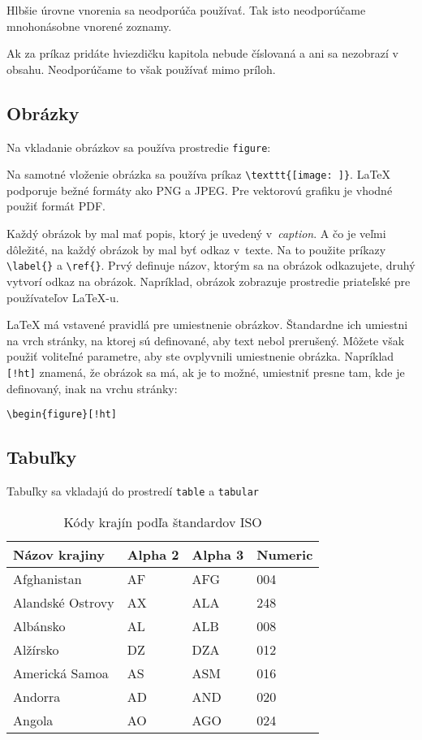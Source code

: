 Hlbšie úrovne vnorenia sa neodporúča používať. Tak isto neodporúčame mnohonásobne vnorené zoznamy.

Ak za príkaz pridáte hviezdičku kapitola nebude číslovaná a ani sa nezobrazí v obsahu. Neodporúčame to však používať mimo príloh.

\subsection*{Obrázky}

Na vkladanie obrázkov sa používa prostredie \texttt{figure}:

Na samotné vloženie obrázka sa používa príkaz \verb|\texttt{[image: ]}|. \LaTeX{} podporuje bežné formáty ako PNG a JPEG. Pre vektorovú grafiku je vhodné použiť formát PDF.

Každý obrázok by mal mať popis, ktorý je uvedený v~\emph{caption}. A čo je veľmi dôležité, na každý obrázok by mal byť odkaz v~texte. Na to použite príkazy \verb|\label{}| a \verb|\ref{}|. Prvý definuje názov, ktorým sa na obrázok odkazujete, druhý vytvorí odkaz na obrázok. Napríklad, obrázok zobrazuje prostredie priateľské pre používateľov \LaTeX-u.

\LaTeX{} má vstavené pravidlá pre umiestnenie obrázkov. Štandardne ich umiestni na vrch stránky, na ktorej sú definované, aby text nebol prerušený. Môžete však použiť voliteľné parametre, aby ste ovplyvnili umiestnenie obrázka. Napríklad \texttt{[!ht]} znamená, že obrázok sa má, ak je to možné, umiestniť presne tam, kde je definovaný, inak na vrchu stránky:

\begin{lstlisting}
\begin{figure}[!ht]
\end{lstlisting}

\subsection*{Tabuľky}

Tabuľky sa vkladajú do prostredí \texttt{table} a \texttt{tabular}

\begin{table}[!ht]
	\caption{Kódy krajín podľa štandardov ISO}\label{t:1}
	\smallskip
	\centering

	\begin{tabular}{llll}
		\toprule
		Názov krajiny & Alpha 2 & Alpha 3 & Numeric\\
		\midrule
		Afghanistan & AF & AFG & 004\\
		Alandské Ostrovy & AX & ALA & 248\\
		Albánsko & AL & ALB & 008\\
		Alžírsko & DZ & DZA & 012\\
		Americká Samoa & AS & ASM & 016\\
		Andorra & AD & AND & 020\\
		Angola & AO & AGO & 024\\
		\toprule
	\end{tabular}
\end{table}

